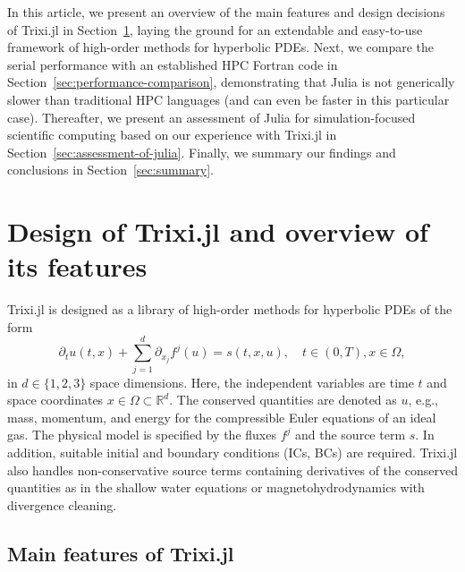 \documentclass{juliacon}
\makeatletter
\newcommand{\eg}[0]{{e.g.\@}\xspace}
\newcommand{\trixi}{Trixi.jl\xspace}
\makeatother
\begin{document}
In this article, we present an overview of the main features and design decisions
of \trixi in Section~\ref{sec:design-of-trixi}, laying the ground for an extendable
and easy-to-use framework of high-order methods for hyperbolic PDEs. Next, we
compare the serial performance with an established HPC Fortran code in
Section~\ref{sec:performance-comparison}, demonstrating that Julia is not generically
slower than traditional HPC languages (and can even be faster in this particular case).
Thereafter, we present an assessment of Julia for simulation-focused scientific
computing based on our experience with \trixi in Section~\ref{sec:assessment-of-julia}.
Finally, we summary our findings and conclusions in Section~\ref{sec:summary}.



\section{Design of \trixi and overview of its features}
\label{sec:design-of-trixi}

\trixi is designed as a library of high-order methods for hyperbolic PDEs of
the form
\begin{equation}
\label{eq:hcl}
  \partial_t u(t, x) + \sum_{j=1}^d \partial_{x_j} f^j(u) = s(t, x, u),
  \quad t \in (0, T), x \in \Omega, 
\end{equation}
in $d \in \{1, 2, 3\}$ space dimensions. Here, the independent variables are
time $t$ and space coordinates $x \in \Omega \subset \mathbb{R}^d$. The conserved
quantities are denoted as $u$, \eg, mass, momentum, and energy for the compressible
Euler equations of an ideal gas.
The physical model is specified by the fluxes $f^j$ and the source term $s$.
In addition, suitable initial and boundary conditions (ICs, BCs) are required.
\trixi also handles non-conservative source terms containing derivatives of the
conserved quantities as in the shallow water equations or magnetohydrodynamics
with divergence cleaning.


\subsection{Main features of \trixi}
\end{document}
